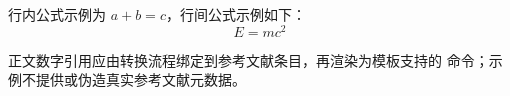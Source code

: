 
行内公式示例为 $a+b=c$，行间公式示例如下：
\begin{equation}
  E = mc^2
  \label{eq:example}
\end{equation}

正文数字引用应由转换流程绑定到参考文献条目，再渲染为模板支持的
命令；示例不提供或伪造真实参考文献元数据。


